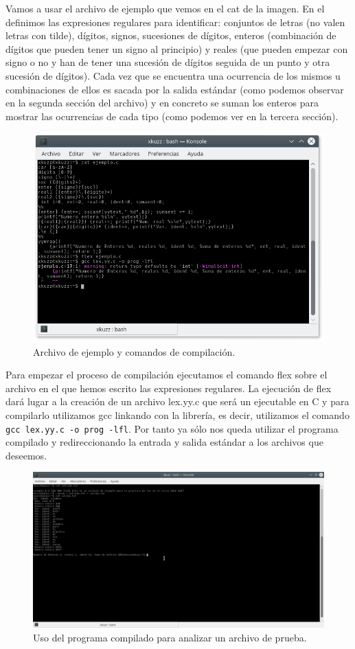 Vamos a usar el archivo de ejemplo que vemos en el cat de la imagen. En el definimos las expresiones regulares para identificar: conjuntos de letras (no valen letras con tilde), dígitos, signos, sucesiones de dígitos, enteros (combinación de dígitos que pueden tener un signo al principio) y reales (que pueden empezar con signo o no y han de tener una sucesión de dígitos seguida de un punto y otra sucesión de dígitos). Cada vez que se encuentra una ocurrencia de los mismos u combinaciones de ellos es sacada por la salida estándar (como podemos observar en la segunda sección del archivo) y en concreto se suman los enteros para mostrar las ocurrencias de cada tipo (como podemos ver en la tercera sección).

\begin{figure}[H]
	\centering
	\includegraphics[scale=0.75]{flex1.png}
	\caption{Archivo de ejemplo y comandos de compilación.}
\end{figure}

Para empezar el proceso de compilación ejecutamos el comando flex sobre el archivo en el que hemos escrito las expresiones regulares. La ejecución de flex dará lugar a la creación de un archivo lex.yy.c que será un ejecutable en C y para compilarlo utilizamos gcc linkando con la librería, es decir, utilizamos el comando \verb| gcc lex.yy.c -o prog -lfl|. Por tanto ya sólo nos queda utilizar el programa compilado y redireccionando la entrada y salida estándar a los archivos que deseemos.
\begin{figure}[H]
	\centering
	\includegraphics[scale=0.45]{flex2.png}
	\caption{Uso del programa compilado para analizar un archivo de prueba.}
\end{figure}


